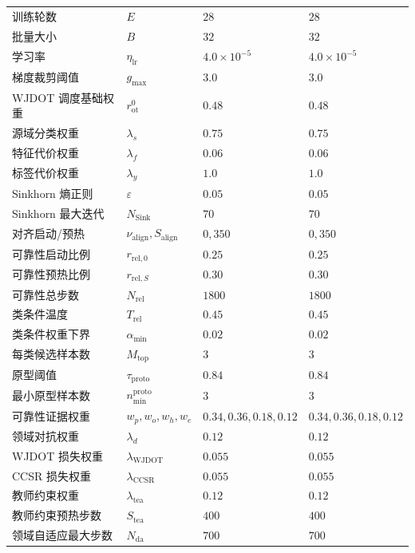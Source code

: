 \documentclass{seuthesis-2022}
\begin{document}
{\begin{longtable}{@{}>{\raggedright\arraybackslash}p{}>{\raggedright\arraybackslash}p{}>{\raggedright\arraybackslash}p{}>{\raggedright\arraybackslash}p{}@{}}
    训练轮数 & $E$ & $28$ & $28$ \\
    批量大小 & $B$ & $32$ & $32$ \\
    学习率 & $\eta_{\mathrm{lr}}$ & $4.0\times10^{-5}$ & $4.0\times10^{-5}$ \\
    梯度裁剪阈值 & $g_{\max}$ & $3.0$ & $3.0$ \\
    WJDOT 调度基础权重 & $r_{\mathrm{ot}}^0$ & $0.48$ & $0.48$ \\
    源域分类权重 & $\lambda_s$ & $0.75$ & $0.75$ \\
    特征代价权重 & $\lambda_f$ & $0.06$ & $0.06$ \\
    标签代价权重 & $\lambda_y$ & $1.0$ & $1.0$ \\
    Sinkhorn 熵正则 & $\varepsilon$ & $0.05$ & $0.05$ \\
    Sinkhorn 最大迭代 & $N_{\mathrm{Sink}}$ & $70$ & $70$ \\
    对齐启动/预热 & $\nu_{\mathrm{align}},S_{\mathrm{align}}$ & $0,350$ & $0,350$ \\
    可靠性启动比例 & $r_{\mathrm{rel},0}$ & $0.25$ & $0.25$ \\
    可靠性预热比例 & $r_{\mathrm{rel},S}$ & $0.30$ & $0.30$ \\
    可靠性总步数 & $N_{\mathrm{rel}}$ & $1800$ & $1800$ \\
    类条件温度 & $T_{\mathrm{rel}}$ & $0.45$ & $0.45$ \\
    类条件权重下界 & $\alpha_{\min}$ & $0.02$ & $0.02$ \\
    每类候选样本数 & $M_{\mathrm{top}}$ & $3$ & $3$ \\
    原型阈值 & $\tau_{\mathrm{proto}}$ & $0.84$ & $0.84$ \\
    最小原型样本数 & $n_{\min}^{\mathrm{proto}}$ & $3$ & $3$ \\
    可靠性证据权重 & $w_p,w_o,w_h,w_e$ & $0.34,0.36,0.18,0.12$ & $0.34,0.36,0.18,0.12$ \\
    领域对抗权重 & $\lambda_d$ & $0.12$ & $0.12$ \\
    WJDOT 损失权重 & $\lambda_{\mathrm{WJDOT}}$ & $0.055$ & $0.055$ \\
    CCSR 损失权重 & $\lambda_{\mathrm{CCSR}}$ & $0.055$ & $0.055$ \\
    教师约束权重 & $\lambda_{\mathrm{tea}}$ & $0.12$ & $0.12$ \\
    教师约束预热步数 & $S_{\mathrm{tea}}$ & $400$ & $400$ \\
    领域自适应最大步数 & $N_{\mathrm{da}}$ & $700$ & $700$ \\

\end{longtable}}
\end{document}
